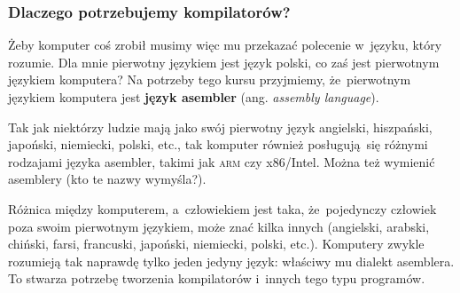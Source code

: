 \documentclass[10pt,t]{beamer}
\begin{document}
\begin{frame}
  \frametitle{Dlaczego potrzebujemy kompilatorów?}

  \pause


  Żeby komputer coś zrobił musimy więc mu przekazać polecenie w~języku,
  który rozumie. Dla mnie pierwotny językiem jest język polski, co zaś
  jest pierwotnym językiem komputera? Na potrzeby tego kursu przyjmiemy,
  że~pierwotnym językiem komputera jest \textbf{język asembler}
  (ang. \textit{assembly language}).

  Tak jak niektórzy ludzie mają jako swój pierwotny język angielski,
  hiszpański, japoński, niemiecki, polski, etc., tak komputer również
  posługują~się różnymi rodzajami języka asembler, takimi jak \textsc{arm}
  czy x86/Intel. Można też wymienić asemblery  (kto te nazwy
  wymyśla?).

  Różnica między komputerem, a~człowiekiem jest taka, że~pojedynczy człowiek
  poza swoim pierwotnym językiem, może znać kilka innych (angielski,
  arabski, chiński, farsi, francuski, japoński, niemiecki, polski, etc.).
  Komputery zwykle rozumieją tak naprawdę tylko \alert{jeden jedyny}
  język: właściwy mu dialekt asemblera. To stwarza potrzebę tworzenia
  kompilatorów i~innych tego typu programów.









\end{frame}
\end{document}
